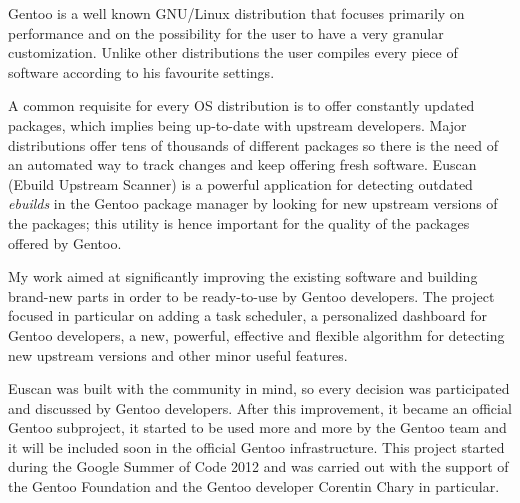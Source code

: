 
Gentoo is a well known GNU/Linux distribution that focuses primarily on performance and on the possibility for the user to have a very granular customization. Unlike other distributions the user compiles every piece of software according to his favourite settings.

A common requisite for every OS distribution is to offer constantly updated packages, which implies being up-to-date with upstream developers. Major distributions offer tens of thousands of different packages so there is the need of an automated way to track changes and keep offering fresh software.
Euscan (Ebuild Upstream Scanner) is a powerful application for detecting outdated \emph{ebuilds} in the Gentoo package manager by looking for new upstream versions of the packages; this utility is hence important for the quality of the packages offered by Gentoo.

My work aimed at significantly improving the existing software and building brand-new parts in order to be ready-to-use by Gentoo developers. The project focused in particular on adding a task scheduler, a personalized dashboard for Gentoo developers, a new, powerful, effective and flexible algorithm for detecting new upstream versions and other minor useful features.

Euscan was built with the community in mind, so every decision was participated and discussed by Gentoo developers. After this improvement, it became an official Gentoo subproject, it started to be used more and more by the Gentoo team and it will be included soon in the official Gentoo infrastructure.
This project started during the Google Summer of Code 2012 and was carried out with the support of the Gentoo Foundation and the Gentoo developer Corentin Chary in particular.

